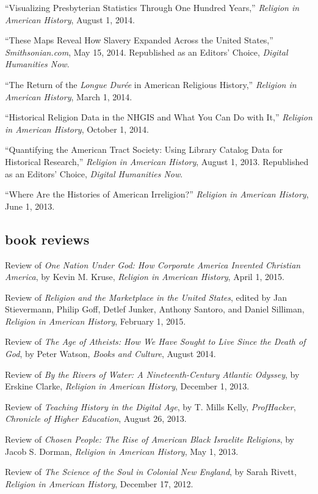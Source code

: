 \documentclass[11pt]{article}
\begin{document}
``Visualizing Presbyterian Statistics Through One Hundred Years,''
\emph{Religion in American History}, August 1, 2014.

``These Maps Reveal How Slavery Expanded Across the United States,''
\emph{Smithsonian.com}, May 15, 2014. Republished as an Editors' Choice,
\emph{Digital Humanities Now}.

``The Return of the \emph{Longue Durée} in American Religious History,''
\emph{Religion in American History}, March 1, 2014.

``Historical Religion Data in the NHGIS and What You Can Do with It,''
\emph{Religion in American History}, October 1, 2014.

``Quantifying the American Tract Society: Using Library Catalog Data for
Historical Research,'' \emph{Religion in American History}, August 1,
2013. Republished as an Editors' Choice, \emph{Digital Humanities Now}.

``Where Are the Histories of American Irreligion?'' \emph{Religion in
American History}, June 1, 2013.

\subsection{book reviews}\label{book-reviews}

Review of \emph{One Nation Under God: How Corporate America Invented Christian 
  America}, by Kevin M. Kruse, \emph{Religion in American History}, April 1, 
2015.

Review of \emph{Religion and the Marketplace in the United States},
edited by Jan Stievermann, Philip Goff, Detlef Junker, Anthony Santoro,
and Daniel Silliman, \emph{Religion in American History}, February 1,
2015.

Review of \emph{The Age of Atheists: How We Have Sought to Live Since
the Death of God}, by Peter Watson, \emph{Books and Culture}, August
2014.

Review of \emph{By the Rivers of Water: A Nineteenth-Century Atlantic
Odyssey}, by Erskine Clarke, \emph{Religion in American History},
December 1, 2013.

Review of \emph{Teaching History in the Digital Age}, by T. Mills Kelly,
\emph{ProfHacker}, \emph{Chronicle of Higher Education}, August 26,
2013.

Review of \emph{Chosen People: The Rise of American Black Israelite
Religions}, by Jacob S. Dorman, \emph{Religion in American History}, May
1, 2013.

Review of \emph{The Science of the Soul in Colonial New England}, by
Sarah Rivett, \emph{Religion in American History}, December 17, 2012.
\end{document}
